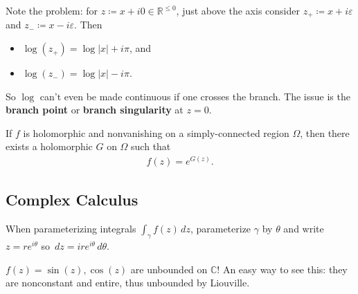 \begin{remark}

Note the problem: for \(z\coloneqq x+i0 \in {\mathbb{R}}^{\leq 0}\),
just above the axis consider \(z_+ \coloneqq x + i{\varepsilon}\) and
\(z_- \coloneqq x-i{\varepsilon}\). Then

\begin{itemize}
\tightlist
\item
  \(\log(z_+) = \log{\left\lvert {x} \right\rvert} + i\pi\), and
\item
  \(\log(z_-) = \log{\left\lvert {x} \right\rvert} - i\pi\).
\end{itemize}

So \(\log\) can't even be made continuous if one crosses the branch. The
issue is the \textbf{branch point} or \textbf{branch singularity} at
\(z=0\).

\end{remark}

\begin{theorem}

If \(f\) is holomorphic and nonvanishing on a simply-connected region
\(\Omega\), then there exists a holomorphic \(G\) on \(\Omega\) such
that
\begin{align*}
f(z) = e^{G(z)}
.\end{align*}

\end{theorem}

\hypertarget{complex-calculus}{%
\subsection{Complex Calculus}\label{complex-calculus}}

\begin{remark}

When parameterizing integrals \(\int_\gamma f(z)\,dz\), parameterize
\(\gamma\) by \(\theta\) and write \(z=re^{i\theta}\) so
\(\,dz= ire^{i\theta}\,d\theta\).

\end{remark}

\begin{warnings}

\(f(z) = \sin(z), \cos(z)\) are unbounded on \({\mathbb{C}}\)! An easy
way to see this: they are nonconstant and entire, thus unbounded by
Liouville.

\end{warnings}

